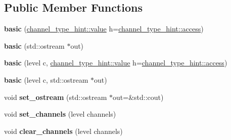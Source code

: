 \subsection*{Public Member Functions}
\begin{DoxyCompactItemize}
\item 
{\bfseries basic} (\hyperlink{structwebsocketpp_1_1log_1_1channel__type__hint_ad12a7f6555b71aabdc4cbec604dc89dd}{channel\+\_\+type\+\_\+hint\+::value} h=\hyperlink{structwebsocketpp_1_1log_1_1channel__type__hint_a8c38587fffbffbfcfc35577734b0d653}{channel\+\_\+type\+\_\+hint\+::access})\hypertarget{classwebsocketpp_1_1log_1_1basic_a161725427aab2220743211512156810e}{}\label{classwebsocketpp_1_1log_1_1basic_a161725427aab2220743211512156810e}

\item 
{\bfseries basic} (std\+::ostream $\ast$out)\hypertarget{classwebsocketpp_1_1log_1_1basic_ad1ba9e1e73f035b527f7cbcde6ceb709}{}\label{classwebsocketpp_1_1log_1_1basic_ad1ba9e1e73f035b527f7cbcde6ceb709}

\item 
{\bfseries basic} (level c, \hyperlink{structwebsocketpp_1_1log_1_1channel__type__hint_ad12a7f6555b71aabdc4cbec604dc89dd}{channel\+\_\+type\+\_\+hint\+::value} h=\hyperlink{structwebsocketpp_1_1log_1_1channel__type__hint_a8c38587fffbffbfcfc35577734b0d653}{channel\+\_\+type\+\_\+hint\+::access})\hypertarget{classwebsocketpp_1_1log_1_1basic_aa38b56b9985927e20e54ff618b23409f}{}\label{classwebsocketpp_1_1log_1_1basic_aa38b56b9985927e20e54ff618b23409f}

\item 
{\bfseries basic} (level c, std\+::ostream $\ast$out)\hypertarget{classwebsocketpp_1_1log_1_1basic_a43ccea903a0da548beace831b8629a1a}{}\label{classwebsocketpp_1_1log_1_1basic_a43ccea903a0da548beace831b8629a1a}

\item 
void {\bfseries set\+\_\+ostream} (std\+::ostream $\ast$out=\&std\+::cout)\hypertarget{classwebsocketpp_1_1log_1_1basic_ad35f40223f3a5a1e5650600f00938047}{}\label{classwebsocketpp_1_1log_1_1basic_ad35f40223f3a5a1e5650600f00938047}

\item 
void {\bfseries set\+\_\+channels} (level channels)\hypertarget{classwebsocketpp_1_1log_1_1basic_a35e70935ce8b7a30c6eafea45181907a}{}\label{classwebsocketpp_1_1log_1_1basic_a35e70935ce8b7a30c6eafea45181907a}

\item 
void {\bfseries clear\+\_\+channels} (level channels)\hypertarget{classwebsocketpp_1_1log_1_1basic_a46bedf7f2bca8e28b39d0b6a4816a8d1}{}\label{classwebsocketpp_1_1log_1_1basic_a46bedf7f2bca8e28b39d0b6a4816a8d1}


\end{DoxyCompactItemize}
